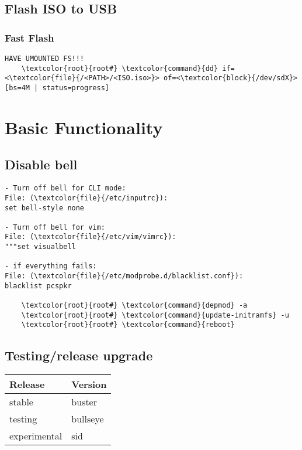 \documentclass[10pt, a4paper, onecolumn, openany]{book} %
\begin{document}
\section{Flash ISO to USB}
\subsection{Fast Flash}
\begin{Verbatim}[commandchars=\\\{\}]
HAVE UMOUNTED FS!!!
    \textcolor{root}{root#} \textcolor{command}{dd} if=<\textcolor{file}{/<PATH>/<ISO.iso>}> of=<\textcolor{block}{/dev/sdX}> [bs=4M | status=progress]
\end{Verbatim}


\chapter{Basic Functionality}
\section{Disable bell}
\begin{Verbatim}[commandchars=\\\{\}]
- Turn off bell for CLI mode:
File: (\textcolor{file}{/etc/inputrc}):
set bell-style none

- Turn off bell for vim:
File: (\textcolor{file}{/etc/vim/vimrc}):
"""set visualbell

- if everything fails:
File: (\textcolor{file}{/etc/modprobe.d/blacklist.conf}):
blacklist pcspkr

    \textcolor{root}{root#} \textcolor{command}{depmod} -a
    \textcolor{root}{root#} \textcolor{command}{update-initramfs} -u
    \textcolor{root}{root#} \textcolor{command}{reboot}
\end{Verbatim}


\section{Testing/release upgrade}
\begin{center}
    \begin{small}
    \begin{tabular}{|p{4cm}|p{4cm}|}
    \hline
    \textbf{Release} & \textbf{Version} \\
    \hline
    stable & buster \\
    \hline
    testing & bullseye \\
    \hline
    experimental & sid \\
    \hline
    \end{tabular}
    \end{small}
\end{center}
\end{document}
